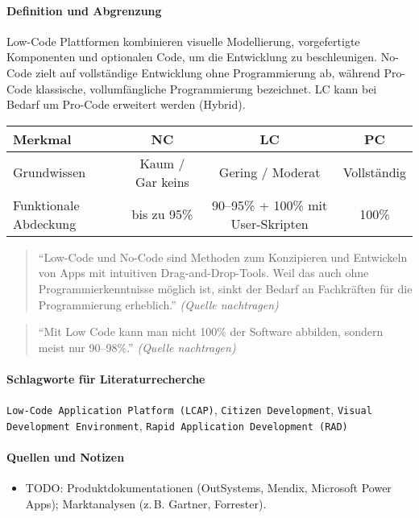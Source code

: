 \paragraph{Definition und Abgrenzung}
Low-Code Plattformen kombinieren visuelle Modellierung, vorgefertigte Komponenten und optionalen Code, um die Entwicklung zu beschleunigen. No-Code zielt auf vollständige Entwicklung ohne Programmierung ab, während Pro-Code klassische, vollumfängliche Programmierung bezeichnet. LC kann bei Bedarf um Pro-Code erweitert werden (Hybrid).

\begin{center}
\begin{tabular}{lccc}
\textbf{Merkmal} & \textbf{NC} & \textbf{LC} & \textbf{PC} \\
\hline
Grundwissen & Kaum / Gar keins & Gering / Moderat & Vollständig \\
Funktionale Abdeckung & bis zu 95\% & 90--95\% + 100\% mit User-Skripten & 100\% \\
\end{tabular}
\end{center}

\begin{quote}
``Low-Code und No-Code sind Methoden zum Konzipieren und Entwickeln von Apps mit intuitiven Drag-and-Drop-Tools. Weil das auch ohne Programmierkenntnisse möglich ist, sinkt der Bedarf an Fachkräften für die Programmierung erheblich.'' \textit{(Quelle nachtragen)}
\end{quote}

\begin{quote}
``Mit Low Code kann man nicht 100\% der Software abbilden, sondern meist nur 90--98\%.'' \textit{(Quelle nachtragen)}
\end{quote}

\paragraph{Schlagworte für Literaturrecherche}
\texttt{Low-Code Application Platform (LCAP)}, \texttt{Citizen Development}, \texttt{Visual Development Environment}, \texttt{Rapid Application Development (RAD)}

\paragraph{Quellen und Notizen}
\begin{itemize}
  \item TODO: Produktdokumentationen (OutSystems, Mendix, Microsoft Power Apps); Marktanalysen (z.\,B. Gartner, Forrester).
\end{itemize}

